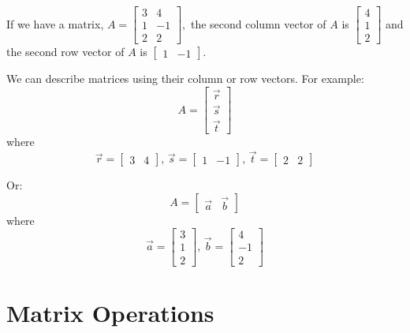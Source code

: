 \documentclass[../main.tex]{subfiles}
\begin{document}
\begin{example}[]
    If we have a matrix, \( A = \begin{bmatrix}
        3 & 4 \\
        1 & -1 \\
        2 & 2 
    \end{bmatrix}, \)
    the second column vector of \( A \) is \( \begin{bmatrix}
        4 \\
        1 \\
        2
    \end{bmatrix} \)
    and the second row vector of \( A \) is \( \begin{bmatrix}
        1 & -1
    \end{bmatrix} \).

    We can describe matrices using their column or row vectors. For example:
    \[ A = \begin{bmatrix}
        \vec{r} \\
        \vec{s} \\
        \vec{t}
    \end{bmatrix} \]
    where \[ \vec{r} = \begin{bmatrix}
        3 & 4
    \end{bmatrix}, \, \vec{s} = \begin{bmatrix}
        1 & -1
    \end{bmatrix}, \, \vec{t} = \begin{bmatrix}
        2 & 2
    \end{bmatrix} \]

    Or: \[ A = \begin{bmatrix}
        \vec{a} & \vec{b}
    \end{bmatrix} \]
    where \[ \vec{a} = \begin{bmatrix}
        3 \\
        1 \\
        2
    \end{bmatrix}, \, \vec{b} = \begin{bmatrix}
        4 \\
        -1 \\
        2
    \end{bmatrix} \]
\end{example}


\section{Matrix Operations}
\end{document}
